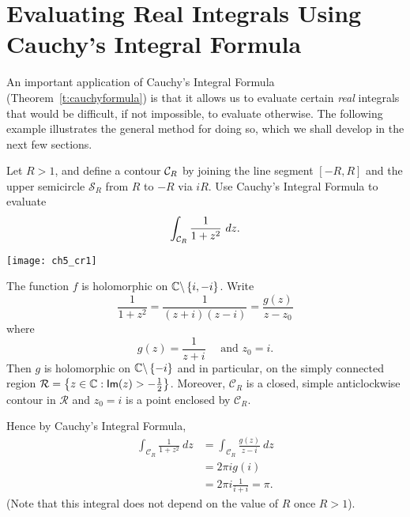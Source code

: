 \section{Evaluating Real Integrals Using Cauchy's Integral Formula}
An important application of Cauchy's Integral Formula (Theorem~\ref{t:cauchyformula}) is that it allows us to evaluate certain \emph{real} integrals that would be difficult, if not impossible, to evaluate otherwise.  The following example illustrates the general method for doing so, which we shall develop in the next few sections.
\begin{example}
\label{e:realint1}
Let $R>1$, and define a contour $\mathcal{C}_R$ by joining the line segment $[-R,R]$ and the upper semicircle $\mathcal{S}_R$ from $R$ to $-R$ via $iR$.  Use Cauchy's Integral Formula to evaluate
\[
\int_{\mathcal{C}_R} \frac{1}{1+z^2}\ dz.
\]
\begin{center}
\texttt{[image: ch5\_cr1]}
\end{center}
\end{example}
\begin{solution}
The function $f$ is holomorphic on $\mathbb{C} \backslash \left\{i,-i\right\}$.  Write
\[
\frac{1}{1+z^2} = \frac{1}{(z+i)(z-i)} = \frac{g(z)}{z-z_0}
\]
where
\[
g(z) = \frac{1}{z+i}\quad \text{ and } z_0=i.
\]
Then $g$ is holomorphic on $\mathbb{C} \backslash \left\{-i\right\}$ and in particular, on the simply connected region $\mathcal{R} = \left\{ z \in \mathbb{C}: \textsf{Im} (z) > - \frac{1}{2}\right\}$.  Moreover, $\mathcal{C}_R$ is a closed, simple anticlockwise contour in $\mathcal{R}$ and $z_0=i$ is a point enclosed by $\mathcal{C}_R$.
\begin{comment}
\begin{center}
\texttt{[image: ch5\_cr1]}
\end{center}
\end{comment}
Hence by Cauchy's Integral Formula,
\begin{align*}
\int_{\mathcal{C}_R} \frac{1}{1+z^2}\ dz &= \int_{\mathcal{C}_R} \frac{g(z)}{z-i}\ dz \\
&= 2 \pi i g(i) \\
& = 2\pi i \frac{1}{i+i} = \pi.
\end{align*}
(Note that  this integral does not depend on the value of $R$ once $R>1$).

\end{solution}

